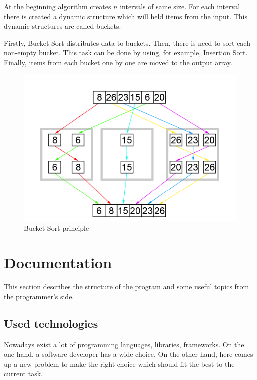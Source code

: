 \documentclass[
  field=inf,
  biblatex,
  language=english,
  glossaries,
  theorems=false,
  sourcecodes=false,
  index
]{kidiplom}
\begin{document}
At the beginning algorithm creates $n$ intervals of same size. For each interval there is created a dynamic structure which will held items from the input. This dynamic structures are called buckets.

Firstly, Bucket Sort distributes data to buckets. Then, there is need to sort each non-empty bucket. This task can be done by using, for example, \hyperref[sec:insertion]{Insertion Sort}. Finally, items from each bucket one by one are moved to the output array.

\begin{figure}[H]
\begin{center}
	
	\includegraphics[scale=0.3]{img/Bucketsort.png}
	\caption{Bucket Sort principle}\label{fig:bucketsort}
\end{center}
\end{figure}

\newpage
\section{Documentation}

This section describes the structure of the program and some useful topics from the programmer's side. 

\subsection{Used technologies}

Nowadays exist a lot of programming languages, libraries, frameworks. On the one hand, a software developer has a wide choice. On the other hand, here comes up a new problem to make the right choice which should fit the best to the current task.
\end{document}
